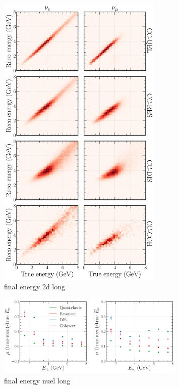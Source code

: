 \begin{figure} %
    \includegraphics[width=0.7\textwidth]{diagrams/6-cvn/chipsnet/final_energy_2d.pdf}
    \caption[final energy 2d short]
    {final energy 2d long}
    \label{fig:final_energy_2d}
\end{figure}

\begin{figure} %
    \includegraphics[width=0.8\textwidth]{diagrams/6-cvn/chipsnet/final_energy_nuel.pdf}
    \caption[final energy nuel short]
    {final energy nuel long}
    \label{fig:final_energy_nuel}
\end{figure}

